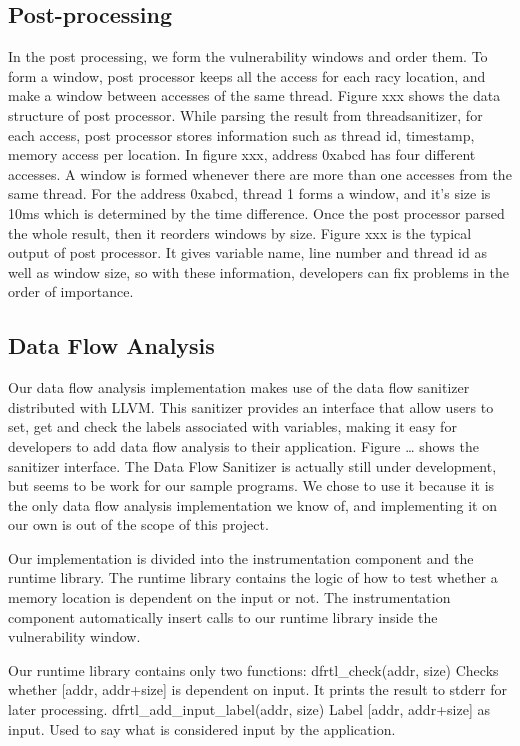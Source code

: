 \documentclass{acm_proc_article-sp}
\begin{document}
\subsection{Post-processing}
In the post processing, we form the vulnerability windows and order them. To form a window, post processor keeps all the access for each racy location, and make a window between accesses of the same thread. Figure xxx shows the data structure of post processor. While parsing the result from threadsanitizer, for each access, post processor stores information such as thread id, timestamp, memory access per location. In figure xxx, address 0xabcd has four different accesses. A window is formed whenever there are more than one accesses from the same thread. For the address 0xabcd, thread 1 forms a window, and it’s size is 10ms which is determined by the time difference. Once the post processor parsed the whole result, then it reorders windows by size. Figure xxx is the typical output of post processor. It gives variable name, line number and thread id as well as window size, so with these information, developers can fix problems in the order of importance.

\subsection{Data Flow Analysis}
Our data flow analysis implementation makes use of the data flow sanitizer distributed with LLVM. This sanitizer provides an interface that allow users to set, get and check the labels associated with variables, making it easy for developers to add data flow analysis to their application. Figure … shows the sanitizer interface. The Data Flow Sanitizer is actually still under development, but seems to be work for our sample programs. We chose to use it because it is the only data flow analysis implementation we know of, and implementing it on our own is out of the scope of this project.

Our implementation is divided into the instrumentation component and the runtime library. The runtime library contains the logic of how to test whether a memory location is dependent on the input or not.  The instrumentation component automatically insert calls to our runtime library inside the vulnerability window.

Our runtime library contains only two functions:
dfrtl\_check(addr, size)
Checks whether [addr, addr+size] is dependent on input. It prints the result to stderr for later processing.
dfrtl\_add\_input\_label(addr, size)
	Label [addr, addr+size] as input. Used to say what is considered input by the application.
\end{document}
